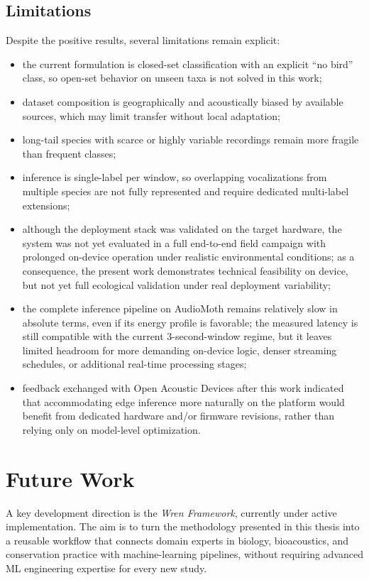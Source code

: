 \documentclass[a4paper,singleside,12pt]{report} %
\begin{document}
	\subsection{Limitations}
	Despite the positive results, several limitations remain explicit:
	\begin{itemize}
		\item the current formulation is closed-set classification with an explicit ``no bird'' class, so open-set behavior on unseen taxa is not solved in this work;
		\item dataset composition is geographically and acoustically biased by available sources, which may limit transfer without local adaptation;
		\item long-tail species with scarce or highly variable recordings remain more fragile than frequent classes;
		\item inference is single-label per window, so overlapping vocalizations from multiple species are not fully represented and require dedicated multi-label extensions;
		\item although the deployment stack was validated on the target hardware, the system was not yet evaluated in a full end-to-end field campaign with prolonged on-device operation under realistic environmental conditions; as a consequence, the present work demonstrates technical feasibility on device, but not yet full ecological validation under real deployment variability;
		\item the complete inference pipeline on AudioMoth remains relatively slow in absolute terms, even if its energy profile is favorable; the measured latency is still compatible with the current 3-second-window regime, but it leaves limited headroom for more demanding on-device logic, denser streaming schedules, or additional real-time processing stages;
		\item feedback exchanged with Open Acoustic Devices after this work indicated that accommodating edge inference more naturally on the platform would benefit from dedicated hardware and/or firmware revisions, rather than relying only on model-level optimization.
	\end{itemize}
	\section{Future Work}
	A key development direction is the \emph{Wren Framework}, currently under active implementation. The aim is to turn the methodology presented in this thesis into a reusable workflow that connects domain experts in biology, bioacoustics, and conservation practice with machine-learning pipelines, without requiring advanced ML engineering expertise for every new study.
\end{document}
